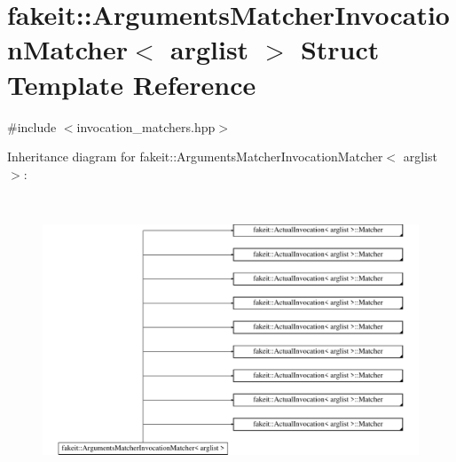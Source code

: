 \hypertarget{structfakeit_1_1ArgumentsMatcherInvocationMatcher}{}\section{fakeit\+::Arguments\+Matcher\+Invocation\+Matcher$<$ arglist $>$ Struct Template Reference}
\label{structfakeit_1_1ArgumentsMatcherInvocationMatcher}


{\ttfamily \#include $<$invocation\+\_\+matchers.\+hpp$>$}

Inheritance diagram for fakeit\+::Arguments\+Matcher\+Invocation\+Matcher$<$ arglist $>$\+:\begin{figure}[H]
\begin{center}
\leavevmode
\includegraphics[height=8.588957cm]{structfakeit_1_1ArgumentsMatcherInvocationMatcher}
\end{center}
\end{figure}
